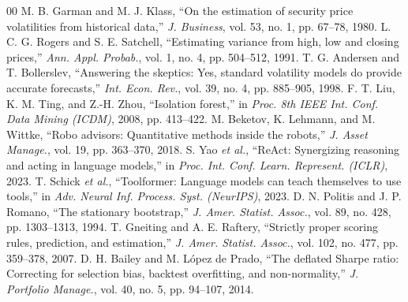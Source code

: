\documentclass[conference]{IEEEtran}
\begin{document}
\begin{thebibliography}{00}
 M. B. Garman and M. J. Klass, ``On the estimation of security price volatilities from historical data,'' \emph{J. Business}, vol. 53, no. 1, pp. 67--78, 1980.
 L. C. G. Rogers and S. E. Satchell, ``Estimating variance from high, low and closing prices,'' \emph{Ann. Appl. Probab.}, vol. 1, no. 4, pp. 504--512, 1991.
 T. G. Andersen and T. Bollerslev, ``Answering the skeptics: Yes, standard volatility models do provide accurate forecasts,'' \emph{Int. Econ. Rev.}, vol. 39, no. 4, pp. 885--905, 1998.
 F. T. Liu, K. M. Ting, and Z.-H. Zhou, ``Isolation forest,'' in \emph{Proc. 8th IEEE Int. Conf. Data Mining (ICDM)}, 2008, pp. 413--422.
 M. Beketov, K. Lehmann, and M. Wittke, ``Robo advisors: Quantitative methods inside the robots,'' \emph{J. Asset Manage.}, vol. 19, pp. 363--370, 2018.
 S. Yao \emph{et al.}, ``ReAct: Synergizing reasoning and acting in language models,'' in \emph{Proc. Int. Conf. Learn. Represent. (ICLR)}, 2023.
 T. Schick \emph{et al.}, ``Toolformer: Language models can teach themselves to use tools,'' in \emph{Adv. Neural Inf. Process. Syst. (NeurIPS)}, 2023.
 D. N. Politis and J. P. Romano, ``The stationary bootstrap,'' \emph{J. Amer. Statist. Assoc.}, vol. 89, no. 428, pp. 1303--1313, 1994.
 T. Gneiting and A. E. Raftery, ``Strictly proper scoring rules, prediction, and estimation,'' \emph{J. Amer. Statist. Assoc.}, vol. 102, no. 477, pp. 359--378, 2007.
 D. H. Bailey and M. L{\'o}pez de Prado, ``The deflated Sharpe ratio: Correcting for selection bias, backtest overfitting, and non-normality,'' \emph{J. Portfolio Manage.}, vol. 40, no. 5, pp. 94--107, 2014.
\end{thebibliography}
\end{document}
